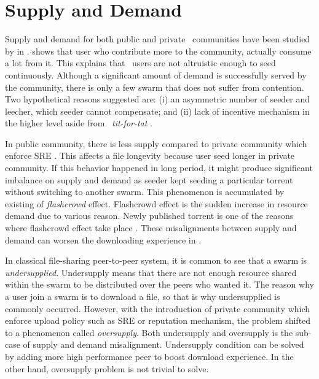 
\section{Supply and Demand}
\label{section:suppdemand}
Supply and demand for both public and private \bt~communities have been studied by \citeauthor{2009:demandsupplyres:andrade} in \citeyear{2009:demandsupplyres:andrade}. \citeauthor{2009:demandsupplyres:andrade} shows that user who contribute more to the community, actually consume a lot from it. This explains that \bt~users are not altruistic enough to seed continuously. Although a significant amount of demand is successfully served by the community, there is only a few swarm that does not suffer from contention. Two hypothetical reasons \citeauthor{2009:demandsupplyres:andrade} suggested are: (i) an asymmetric number of seeder and leecher, which seeder cannot compensate; and (ii) lack of incentive mechanism in the higher level aside from \bt~\textit{tit-for-tat} \cite{2009:demandsupplyres:andrade}. 

In public community, there is less supply compared to private community which enforce SRE \cite{2009:demandsupplyres:andrade}. This affects a file longevity because user seed longer in private community. If this behavior happened in long period, it might produce significant imbalance on supply and demand as seeder kept seeding a particular torrent without switching to another swarm. This phenomenon is accumulated by existing of \textit{flashcrowd} effect. Flashcrowd effect is the sudden increase in resource demand due to various reason. Newly published torrent is one of the reasons where flashcrowd effect take place \cite{2013:swarmevolution:su}. These misalignments between supply and demand can worsen the downloading experience in \bt.

In classical file-sharing peer-to-peer system, it is common to see that a swarm is \textit{undersupplied}. Undersupply means that there are not enough resource shared within the swarm to be distributed over the peers who wanted it. The reason why a user join a swarm is to download a file, so that is why undersupplied is commonly occurred. However, with the introduction of private community which enforce upload policy such as SRE or reputation mechanism, the problem shifted to a phenomenon called \textit{oversupply}. Both undersupply and oversupply is the sub-case of supply and demand misalignment. Undersupply condition can be solved by adding more high performance peer to boost download experience. In the other hand, oversupply problem is not trivial to solve.

